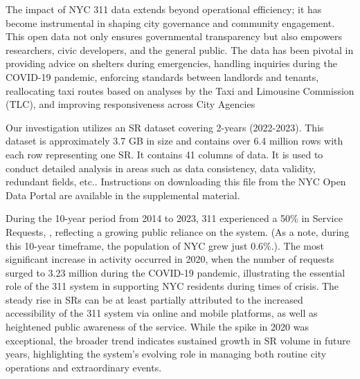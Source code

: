 \documentclass[linenumber]{jdsart}
\begin{document}

The impact of NYC 311 data extends beyond operational efficiency; it
has become instrumental in shaping city governance and community
engagement. This open data not only ensures governmental transparency
but also empowers researchers, civic developers, and the general
public. The data has been pivotal in providing advice on shelters
during emergencies, handling inquiries during the COVID-19 pandemic,
enforcing standards between landlords and tenants, reallocating taxi
routes based on analyses by the Taxi and Limousine Commission (TLC),
and improving responsiveness across City Agencies


Our investigation utilizes an SR dataset covering  2-years (2022-2023).
This dataset is approximately 3.7 GB in size and contains over 
6.4 million rows with each row representing one SR. It contains 
41 columns of data. It is used to conduct detailed analysis 
in areas such as data consistency, data validity, redundant fields, 
etc.. Instructions on downloading this file from the 
NYC Open Data Portal are available in the supplemental material.


During the 10-year period from 2014 to 2023,  311 experienced
a 50\% in Service Requests, , reflecting a growing public reliance 
on the system. (As a note, during this 10-year timeframe, the 
population of NYC grew just 0.6\%.). The most significant increase
in activity occurred in 2020, when the number of requests 
surged to 3.23 million during the COVID-19 pandemic, 
illustrating the essential role of the 311 system in supporting 
NYC residents during times of crisis. The steady 
rise in SRs can be at least partially attributed to the increased 
accessibility of the 311 system via online and mobile 
platforms, as well as heightened public awareness of the service. 
While the spike in 2020 was exceptional, the broader trend 
indicates sustained growth in SR volume in future years,  
highlighting the system's evolving role in managing 
both routine city operations and extraordinary events.
\end{document}
